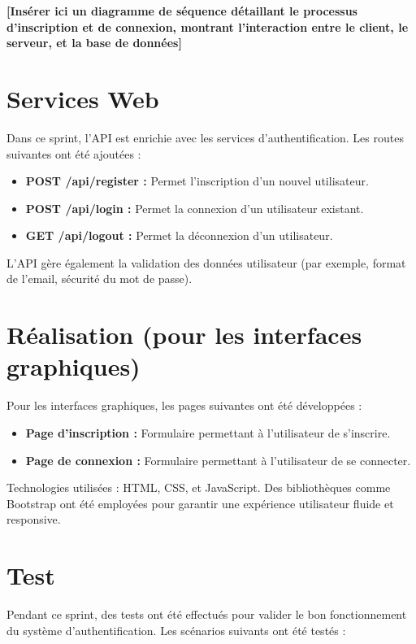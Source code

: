 \documentclass[12pt,a4paper]{report}
\begin{document}
\textbf{[Insérer ici un diagramme de séquence détaillant le processus d'inscription et de connexion, montrant l'interaction entre le client, le serveur, et la base de données]}

\section{Services Web}

Dans ce sprint, l'API est enrichie avec les services d'authentification. Les routes suivantes ont été ajoutées :

\begin{itemize}
    \item \textbf{POST /api/register :} Permet l'inscription d'un nouvel utilisateur.
    \item \textbf{POST /api/login :} Permet la connexion d'un utilisateur existant.
    \item \textbf{GET /api/logout :} Permet la déconnexion d’un utilisateur.
\end{itemize}

L'API gère également la validation des données utilisateur (par exemple, format de l'email, sécurité du mot de passe).

\section{Réalisation (pour les interfaces graphiques)}

Pour les interfaces graphiques, les pages suivantes ont été développées :

\begin{itemize}
    \item \textbf{Page d'inscription :} Formulaire permettant à l'utilisateur de s'inscrire.
    \item \textbf{Page de connexion :} Formulaire permettant à l'utilisateur de se connecter.
\end{itemize}

Technologies utilisées : HTML, CSS, et JavaScript. Des bibliothèques comme Bootstrap ont été employées pour garantir une expérience utilisateur fluide et responsive.

\section{Test}

Pendant ce sprint, des tests ont été effectués pour valider le bon fonctionnement du système d'authentification. Les scénarios suivants ont été testés :
\end{document}
